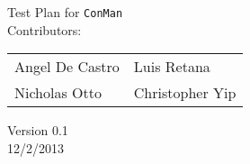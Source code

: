 \begin{titlepage}
\Huge
\vspace{2cm}
\begin{center}
Test Plan for \texttt{ConMan}\\
\vspace{3cm}
\Large
Contributors:\\ 

\begin{tabular}{l l}\hline
Angel De Castro & Luis Retana\\
Nicholas Otto   & Christopher Yip
\end{tabular}
\vspace{1cm}

Version 0.1\\
12/2/2013
\end{center}


\end{titlepage}
